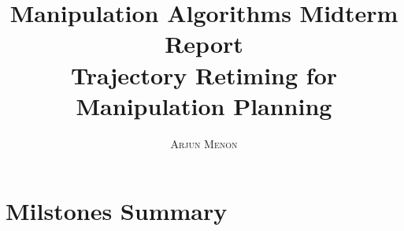 \documentclass[letterpaper,11pt]{article} %
\title{\textbf{Manipulation Algorithms Midterm Report}\\ %
Trajectory Retiming for Manipulation Planning} %
\author{\textsc{Arjun Menon} %
} %
\makeatletter
\renewcommand{\maketitle}{ %
\begin{flushright} %
{\LARGE\@title} %

\vspace{5pt} %

{\large\@author} %
\vspace{0pt} %
\end{flushright}
}
\makeatother
\begin{document}
\maketitle %



%
%
%


\section*{Milstones Summary}\label{sec:proposed}
\end{document}

